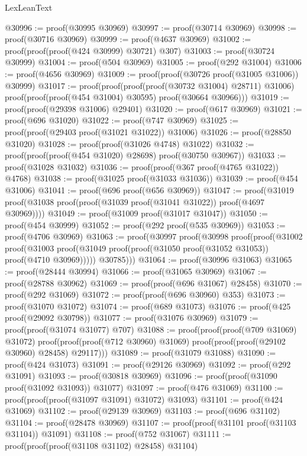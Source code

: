 \begin{lexlean}{LexLeanText}
\begin{coremodule}
@30996 := proof(@30995 @30969)
@30997 := proof(@30714 @30969)
@30998 := proof(@30716 @30969)
@30999 := proof(@4637 @30969)
@31002 := proof(proof(proof(@424 @30999) @30721) @307)
@31003 := proof(@30724 @30999)
@31004 := proof(@504 @30969)
@31005 := proof(@292 @31004)
@31006 := proof(@4656 @30969)
@31009 := proof(proof(@30726 proof(@31005 @31006)) @30999)
@31017 := proof(proof(proof(proof(@30732 @31004) @28711) @31006)
      proof(proof(proof(@454 @31004) @30595) proof(@30664 @30966)))
@31019 := proof(proof(@29398 @31006) @29401)
@31020 := proof(@617 @30969)
@31021 := proof(@696 @31020)
@31022 := proof(@747 @30969)
@31025 := proof(proof(@29403 proof(@31021 @31022)) @31006)
@31026 := proof(@28850 @31020)
@31028 := proof(proof(@31026 @4748) @31022)
@31032 := proof(proof(proof(@454 @31020) @28698) proof(@30750 @30967))
@31033 := proof(@31028 @31032)
@31036 := proof(proof(@367 proof(@4765 @31022)) @4768)
@31038 := proof(@31025 proof(@31033 @31036))
@31039 := proof(@454 @31006)
@31041 := proof(@696 proof(@656 @30969))
@31047 := proof(@31019 proof(@31038 proof(proof(@31039 proof(@31041 @31022)) proof(@4697 @30969))))
@31049 := proof(@31009 proof(@31017 @31047))
@31050 := proof(@454 @30999)
@31052 := proof(@292 proof(@535 @30969))
@31053 := proof(@4706 @30969)
@31063 := proof(@30997
      proof(@30998
          proof(proof(@31002
                proof(@31003
                    proof(@31049 proof(proof(@31050 proof(@31052 @31053)) proof(@4710 @30969)))))
              @30785)))
@31064 := proof(@30996 @31063)
@31065 := proof(@28444 @30994)
@31066 := proof(@31065 @30969)
@31067 := proof(@28788 @30962)
@31069 := proof(proof(@696 @31067) @28458)
@31070 := proof(@292 @31069)
@31072 := proof(proof(@696 @30960) @353)
@31073 := proof(@31070 @31072)
@31074 := proof(@689 @31073)
@31076 := proof(@425 proof(@29092 @30798))
@31077 := proof(@31076 @30969)
@31079 := proof(proof(@31074 @31077) @707)
@31088 := proof(proof(proof(@709 @31069) @31072)
      proof(proof(proof(@712 @30960) @31069) proof(proof(proof(@29102 @30960) @28458) @29117)))
@31089 := proof(@31079 @31088)
@31090 := proof(@424 @31073)
@31091 := proof(@29126 @30969)
@31092 := proof(@292 @31091)
@31093 := proof(@30818 @30969)
@31096 := proof(proof(@31090 proof(@31092 @31093)) @31077)
@31097 := proof(@476 @31069)
@31100 := proof(proof(proof(@31097 @31091) @31072) @31093)
@31101 := proof(@424 @31069)
@31102 := proof(@29139 @30969)
@31103 := proof(@696 @31102)
@31104 := proof(@28478 @30969)
@31107 := proof(proof(@31101 proof(@31103 @31104)) @31091)
@31108 := proof(@752 @31067)
@31111 := proof(proof(proof(@31108 @31102) @28458) @31104)

\end{coremodule}
\end{lexlean}

